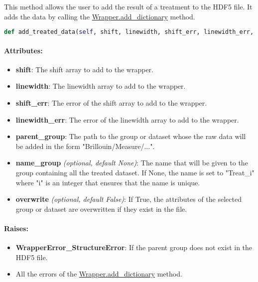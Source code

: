 This method allows the user to add the result of a treatment to the HDF5 file. It adds the data by calling the \hyperref[subchapter:wrapper.add_dictionary]{Wrapper.add\_dictionary} method.

\begin{lstlisting}[language=Python]
def add_treated_data(self, shift, linewidth, shift_err, linewidth_err, parent_group, name_group = None, overwrite = False):
\end{lstlisting}

\paragraph{Attributes:}

\begin{itemize}
    \item \textbf{shift}: The shift array to add to the wrapper. 
    \item \textbf{linewidth}: The linewidth array to add to the wrapper. 
    \item \textbf{shift\_err}: The error of the shift array to add to the wrapper. 
    \item \textbf{linewidth\_err}: The error of the linewidth array to add to the wrapper. 
    \item \textbf{parent\_group}: The path to the group or dataset whose the raw data will be added in the form "Brillouin/Measure/...".
    \item \textbf{name\_group} \textit{(optional, default None)}: The name that will be given to the group containing all the treated dataset. If None, the name is set to "Treat\_i" where "i" is an integer that ensures that the name is unique.
    \item \textbf{overwrite} \textit{(optional, default False)}: If True, the attributes of the selected group or dataset are overwritten if they exist in the file.
\end{itemize}

\paragraph{Raises:}
\begin{itemize}
    \item \textbf{WrapperError\_StructureError}: If the parent group does not exist in the HDF5 file.
    \item All the errors of the \hyperref[subchapter:wrapper.add_dictionary]{Wrapper.add\_dictionary} method.
\end{itemize}
